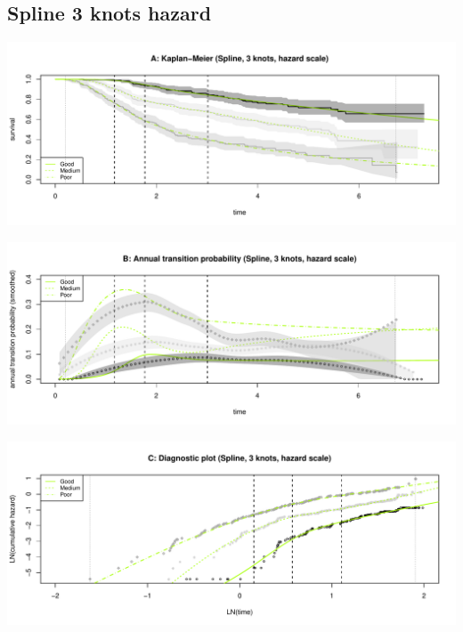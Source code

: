 \documentclass[]{article}
\begin{document}
\newpage

\subsection{Spline 3 knots hazard}\label{spline-3-knots-hazard}

\begin{flushleft}\includegraphics[height=0.25\textheight]{Images/spline_hazard3-1} \end{flushleft}

\begin{flushleft}\includegraphics[height=0.25\textheight]{Images/spline_hazard3-2} \end{flushleft}

\begin{flushleft}\includegraphics[height=0.25\textheight]{Images/spline_hazard3-3} \end{flushleft}
\end{document}
